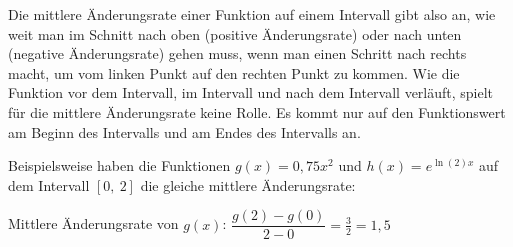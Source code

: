 \bigskip

\begin{minipage}{\textwidth}
\end{minipage}

\bigskip

Die mittlere Änderungsrate einer Funktion auf einem Intervall gibt also an, wie weit man im Schnitt nach oben (positive Änderungsrate) oder nach unten (negative Änderungsrate) gehen muss, wenn man einen Schritt nach rechts macht, um vom linken Punkt auf den rechten Punkt zu kommen. Wie die Funktion vor dem Intervall, im Intervall und nach dem Intervall verläuft, spielt für die mittlere Änderungsrate keine Rolle. Es kommt nur auf den Funktionswert am Beginn des Intervalls und am Endes des Intervalls an.

Beispielsweise haben die Funktionen \(g(x)=0,75x^2\) und \(h(x)=e^{\ln(2)x}\) auf dem Intervall \([0,\ 2]\) die gleiche mittlere Änderungsrate:

Mittlere Änderungsrate von \(g(x)\): \(\dfrac{g(2)-g(0)}{2-0}=\frac{3}{2}=1,5\)

